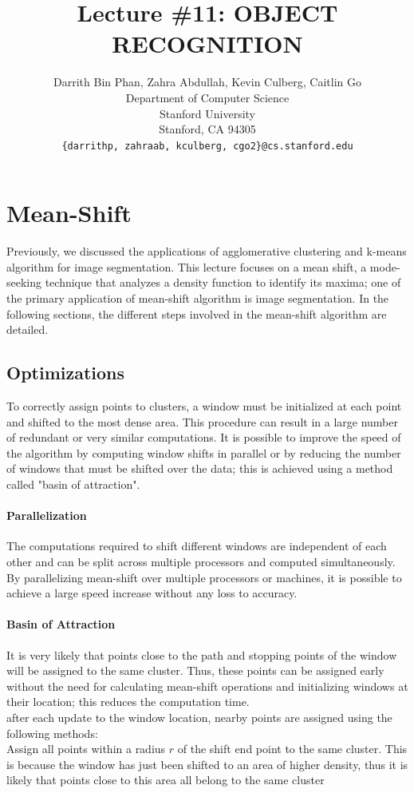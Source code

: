 \documentclass{article}
\title{Lecture \#11: OBJECT RECOGNITION}
\author{
  Darrith Bin Phan, Zahra Abdullah, Kevin Culberg, Caitlin Go \\
  Department of Computer Science\\
  Stanford University\\
  Stanford, CA 94305 \\
  \texttt{\{darrithp, zahraab, kculberg, cgo2\}@cs.stanford.edu} \\
}
\begin{document}
\maketitle

\section{Mean-Shift}

Previously, we discussed the applications of agglomerative clustering and k-means algorithm for image segmentation. This lecture focuses on a mean shift, a mode-seeking technique that analyzes a density function to identify its maxima; one of the primary application of mean-shift algorithm is image segmentation.
In the following sections, the different steps involved in the mean-shift algorithm are detailed.
\subsection{Optimizations}

To correctly assign points to clusters, a window must be initialized at each point and shifted to the most dense area. This procedure can result in a large number of redundant or very similar computations. It is possible to improve the speed of the algorithm by computing window shifts in parallel or by reducing the number of windows that must be shifted over the data; this is achieved using a method called "basin of attraction".

\paragraph{Parallelization}
The computations required to shift different windows are independent of each other and can be split across multiple processors and computed simultaneously. By parallelizing mean-shift over multiple processors or machines, it is possible to achieve a large speed increase without any loss to accuracy.

\paragraph{Basin of Attraction}
It is very likely that points close to the path and stopping points of the window will be assigned to the same cluster. Thus, these points can be assigned early without the need for calculating mean-shift operations and initializing windows at their location; this reduces the computation time. \\
after each update to the window location, nearby points are assigned using the following methods: \\
Assign all points within a radius $r$ of the shift end point to the same cluster. This is because the window has just been shifted to an area of higher density, thus it is likely that points close to this area all belong to the same cluster
\end{document}
